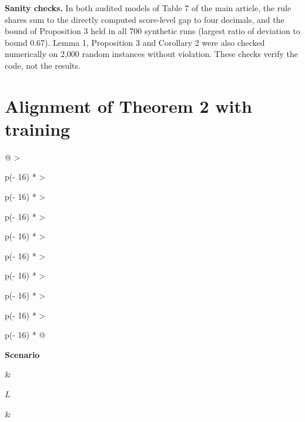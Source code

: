 \textbf{Sanity checks.} In both audited models of Table 7 of the main article, the rule shares sum to the directly computed score-level gap to four decimals, and the bound of Proposition 3 held in all 700 synthetic runs (largest ratio of deviation to bound 0.67). Lemma 1, Proposition 3 and Corollary 2 were also checked numerically on 2,000 random instances without violation. These checks verify the code, not the results.

\hypertarget{alignment-of-theorem-2-with-training}{%
\section{Alignment of Theorem 2 with training}\label{alignment-of-theorem-2-with-training}}

\begin{longtable}[]{@{}
  >{\raggedright\arraybackslash}p{(\columnwidth - 16\tabcolsep) * }
  >{\raggedright\arraybackslash}p{(\columnwidth - 16\tabcolsep) * }
  >{\raggedright\arraybackslash}p{(\columnwidth - 16\tabcolsep) * }
  >{\raggedright\arraybackslash}p{(\columnwidth - 16\tabcolsep) * }
  >{\raggedright\arraybackslash}p{(\columnwidth - 16\tabcolsep) * }
  >{\raggedright\arraybackslash}p{(\columnwidth - 16\tabcolsep) * }
  >{\raggedright\arraybackslash}p{(\columnwidth - 16\tabcolsep) * }
  >{\raggedright\arraybackslash}p{(\columnwidth - 16\tabcolsep) * }
  >{\raggedright\arraybackslash}p{(\columnwidth - 16\tabcolsep) * }@{}}
\caption{Synthetic data (\(\rho = 0.6\), trainable antecedents, rule-local penalty \(\lambda = 100\), mean over 5 seeds). ``Plain'': log-loss and rule-local penalty only, 100 epochs, last iterate; ``regularised'': objective (3) with early stopping. \(\Psi(f')\) and \(\delta\): regulariser value of the zero-order reference and relative optimisation gap of Corollary 3 (nats), with \(\Omega(f') = 0\) as Lemma 1(b) requires; certificate: the bound of Corollary 3 on \(|\Delta_G(\hat f) - \Delta_G(\eta)|\). Both bounds of Corollary 3 held in all 80 runs; the largest ratio of deviation to certificate was 0.21.}\tabularnewline
\toprule\noalign{}
\begin{minipage}[b]{\linewidth}\raggedright
\textbf{Scenario}
\end{minipage} & \begin{minipage}[b]{\linewidth}\raggedright
\(L\)
\end{minipage} & \begin{minipage}[b]{\linewidth}\raggedright

\end{minipage}
\end{longtable}
